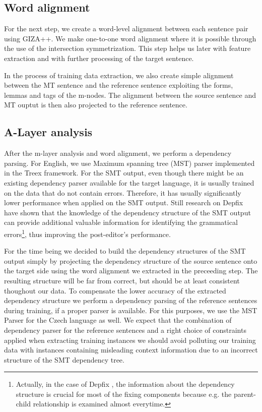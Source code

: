 \subsection{Word alignment}

For the next step, we create a word-level alignment between each sentence pair
using GIZA++\cite{och:ney:2000}. We make one-to-one word alignment where it is possible
through the use of the intersection symmetrization. This step helps us later with feature extraction
and with further processing of the target sentence.

In the process of training data extraction, we also create simple alignment between
the MT sentence and the reference sentence exploiting the forms, lemmas and tags
of the m-nodes. The alignment between the source sentence and MT ouptut is then also
projected to the reference sentence.

\subsection{A-Layer analysis}

After the m-layer analysis and word alignment, we perform a dependency parsing.
For English, we use Maximum spanning tree (MST) parser\cite{mcdonald:pereira:ribarov:hajic:2005}
implemented in the Treex framework. For the SMT output, even though there might
be an existing dependency parser available for the target language, it is usually
trained on the data that do not contain errors. Therefore, it has usually significantly
lower performance when applied on the SMT output. Still research on Depfix have shown
that the knowledge of the dependency structure of the SMT output can provide additional
valuable information for identifying the grammatical errors\footnote{Actually, in the case of Depfix
, the information about the dependency structure is crucial for most of the fixing components
because e.g. the parent-child relationship is examined almost everytime.}, thus improving
the post-editor's performance.

For the time being we decided to build the dependency structures of the SMT output simply
by projecting the dependency structure of the source sentence onto the target side
using the word alignment we extracted in the preceeding step. The resulting structure
will be far from correct, but should be at least consistent thoughout our data.
To compensate the lower accuracy of the extracted dependency structure we perform
a dependency parsing of the reference sentences during training, if a proper parser
is available. For this purposes, we use the MST Parser for the Czech language as well.
We expect that the combination of dependency parser for the reference sentences and
a right choice of constraints applied when extracting training instances we should
avoid polluting our training data with instances containing misleading context information
due to an incorrect structure of the SMT dependency tree.

